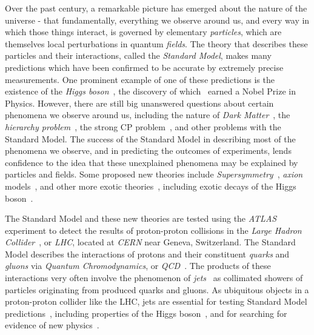 Over the past century, a remarkable picture has emerged about the nature of the universe - that fundamentally, everything we observe around us, and every way in which those things interact, is governed by elementary \textit{particles}, which are themselves local perturbations in quantum \textit{fields}.
The theory that describes these particles and their interactions, called the \textit{Standard Model}, makes many predictions which have been confirmed to be accurate by extremely precise measurements.
One prominent example of one of these predictions is the existence of the \textit{Higgs boson}~\cite{Englert:1964et,Higgs:1964pj,Higgs:1964ia,Guralnik:1964eu}, the discovery of which~\cite{HIGG-2012-27,CMS-HIG-12-028} earned a Nobel Prize in Physics\cite{Nobel2013}.
However, there are still big unanswered questions about certain phenomena we observe around us, including the nature of \textit{Dark Matter}~\cite{Trimble:1987ee,Bertone:2010zza,darkmatter}, the \textit{hierarchy problem}~\cite{Csaki:2016kln,deGouvea:2014xba,Nilles:1982dy}, the strong CP problem~\cite{Dine:2000cj,Peccei:1977hh}, and other problems with the Standard Model.
The success of the Standard Model in describing most of the phenomena we observe, and in predicting the outcomes of experiments, lends confidence to the idea that these unexplained phenomena may be explained by particles and fields.
Some proposed new theories include \textit{Supersymmetry}~\cite{wess_bagger_2009,Wess:1984jr,Lykken:1996xt,Quevedo:2010ui,Strassler:2003qg,Peskin:1997qi,Seiberg:1994pq,Intriligator:2007cp}, \textit{axion} models~\cite{Peccei:1977hh,Baluni:1978rf,Crewther:1979pi,Peccei:1977ur,Weinberg:1977ma,Wilczek:1977pj}, and other more exotic theories~\cite{Lykken:2010mc,Lee:2019zbu,Ellis:2009pz,Ellis:2012zz,Virdee:2016,Halkiadakis:2014qda}, including exotic decays of the Higgs boson~\cite{Curtin:2013fra}.

The Standard Model and these new theories are tested using the \textit{ATLAS} experiment\cite{PERF-2007-01} to detect the results of proton-proton collisions in the \textit{Large Hadron Collider}~\cite{CERN-Brochure-2017-002-Eng,Pettersson:291782,Evans:313675,Evans:2008zzb}, or \textit{LHC}, located at \textit{CERN} near Geneva, Switzerland.
The Standard Model describes the interactions of protons and their constituent \textit{quarks} and \textit{gluons} via \textit{Quantum Chromodynamics}, or \textit{QCD}~\cite{Gell-Mann:2015noa,Fritzsch:1973pi,Fritzsch:1972jv,Ali:2010tw}.
The products of these interactions very often involve the phenomenon of \textit{jets}~\cite{Drell:1969wb,Politzer:1973fx,Blankenbecler:1972cd,Ali:2010tw} as collimated showers of particles originating from produced quarks and gluons.
As ubiquitous objects in a proton-proton collider like the LHC, jets are essential for testing Standard Model predictions~\cite{Pasztor:2019rqu,Asquith:2018igt}, including properties of the Higgs boson~\cite{Aad:2019mbh}, and for searching for evidence of new physics~\cite{Canepa:2019hph,Tam:2015lda,Meirose:2016pxn,Asquith:2018igt}.

